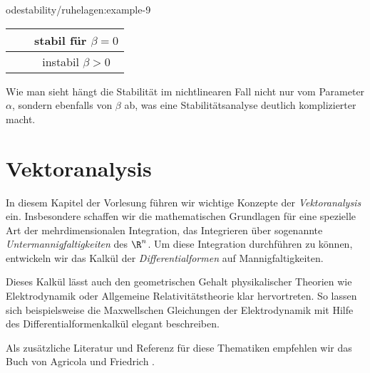 \documentclass[letterpaper,10pt,english]{jupyterBook}
\begin{document}
\begin{example}{}{odestability/ruhelagen:example-9}
\begin{center}
\begin{tabularx}{\linewidth}[{\linewidth}]{|c|c|c|}
&
\par

&
\par
stabil für \(\beta =0 \)
\\
\hline
\par

&
\par

&
\par
instabil \(\beta > 0\)
\\
\hline
\end{tabularx}
\end{center}

\par
Wie man sieht hängt die Stabilität im nichtlinearen Fall nicht nur vom Parameter \(\alpha\), sondern ebenfalls von \(\beta\) ab, was eine Stabilitätsanalyse deutlich komplizierter macht.
\end{example}


\chapter{Vektoranalysis}
\label{\detokenize{vektoranalysis/vektoranalysis:vektoranalysis}}\label{\detokenize{vektoranalysis/vektoranalysis::doc}}
\par
In diesem Kapitel der Vorlesung führen wir wichtige Konzepte der \emph{Vektoranalysis} ein.
Insbesondere schaffen wir die mathematischen Grundlagen für eine spezielle Art der mehrdimensionalen Integration, das Integrieren über sogenannte \emph{Untermannigfaltigkeiten} des \(\R^n\).
Um diese Integration durchführen zu können, entwickeln wir das Kalkül der \emph{Differentialformen} auf Mannigfaltigkeiten.

\par
Dieses Kalkül lässt auch den geometrischen Gehalt physikalischer Theorien wie Elektrodynamik oder Allgemeine Relativitätstheorie klar hervortreten.
So lassen sich beispielsweise die Maxwellschen Gleichungen der Elektrodynamik mit Hilfe des Differentialformenkalkül elegant beschreiben.

\par
Als zusätzliche Literatur und Referenz für diese Thematiken empfehlen wir das Buch von Agricola und Friedrich \cite{AF13}.
\end{document}
